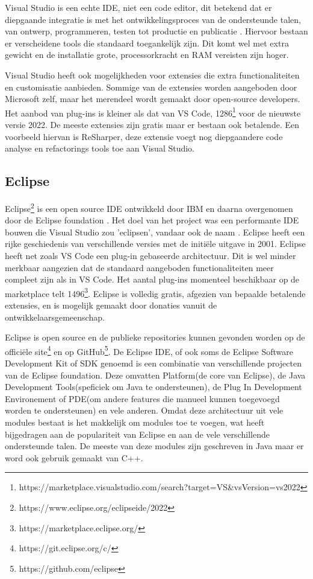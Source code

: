 Visual Studio is een echte IDE, niet een code editor, dit betekend dat er diepgaande integratie is met het ontwikkelingsproces van de ondersteunde talen, van ontwerp, programmeren, testen tot productie en publicatie \autocite{Strauss2019}. Hiervoor bestaan er verscheidene tools die standaard toegankelijk zijn. Dit komt wel met extra gewicht en de installatie grote, processorkracht en RAM vereisten zijn hoger.

Visual Studio heeft ook mogelijkheden voor extensies die extra functionaliteiten en customisatie aanbieden. Sommige van de extensies worden aangeboden door Microsoft zelf, maar het merendeel wordt gemaakt door open-source developers. Het aanbod van plug-ins is kleiner als dat van VS Code, 1286\footnote{https://marketplace.visualstudio.com/search?target=VS\&vsVersion=vs2022} voor de nieuwste versie 2022. De meeste extensies zijn gratis maar er bestaan ook betalende. Een voorbeeld hiervan is ReSharper, deze extensie voegt nog diepgaandere code analyse en refactorings tools toe aan Visual Studio.

\subsection{Eclipse}

Eclipse\footnote{https://www.eclipse.org/eclipseide/2022} is een open source IDE ontwikkeld door IBM en daarna overgenomen door de Eclipse foundation \autocite{Holzner2004}. Het doel van het project was een performante IDE bouwen die Visual Studio zou 'eclipsen', vandaar ook de naam \autocite{Babcock2005}. Eclipse heeft een rijke geschiedenis van verschillende versies met de initiële uitgave in 2001. Eclipse heeft net zoals VS Code een plug-in gebaseerde architectuur. Dit is wel minder merkbaar aangezien dat de standaard aangeboden functionaliteiten meer compleet zijn als in VS Code. Het aantal plug-ins momenteel beschikbaar op de marketplace telt 1496\footnote{https://marketplace.eclipse.org/}. Eclipse is volledig gratis, afgezien van bepaalde betalende extensies, en is mogelijk gemaakt door donaties vanuit de ontwikkelaarsgemeenschap.

Eclipse is open source en de publieke repositories kunnen gevonden worden op de officiële site\footnote{https://git.eclipse.org/c/} en op GitHub\footnote{https://github.com/eclipse}. De Eclipse IDE, of ook soms de Eclipse Software Development Kit of SDK genoemd is een combinatie van verschillende projecten van de Eclipse foundation\autocite{Rivieres2006}. Deze omvatten Platform(de core van Eclipse), de Java Development Tools(speficiek om Java te ondersteunen), de Plug In Development Environement of PDE(om andere features die manueel kunnen toegevoegd worden te ondersteunen) en vele anderen. Omdat deze architectuur uit vele modules bestaat is het makkelijk om modules toe te voegen, wat heeft bijgedragen aan de populariteit van Eclipse en aan de vele verschillende ondersteunde talen. De meeste van deze modules zijn geschreven in Java maar er word ook gebruik gemaakt van C++.

